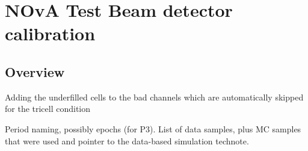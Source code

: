 \documentclass[12pt,a4paper]{article}
\begin{document}

\section{NOvA Test Beam detector calibration}
\subsection{Overview}

Adding the underfilled cells to the bad channels which are automatically skipped for the tricell condition

Period naming, possibly epochs (for P3).
List of data samples, plus MC samples that were used and pointer to the data-based simulation technote.
\end{document}
